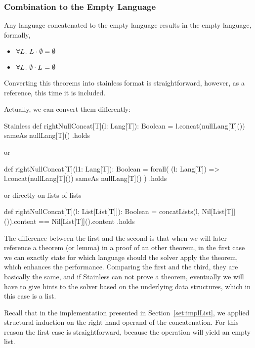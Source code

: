 \subsubsection{Combination to the Empty Language}

\begin{theorem}
	Any language concatenated to the empty language results in the empty language, formally,
	\begin{itemize}
		\item $\forall L_{}. ~ L_{} \cdot \emptyset = \emptyset$
		\item $\forall L_{}. ~ \emptyset \cdot L_{} = \emptyset$
	\end{itemize}
\end{theorem}

Converting this theorems into stainless format is straightforward, however, as a reference, this time it is included.

Actually, we can convert them  differently:

\begin{ShortCode}{Stainless}
 def rightNullConcat[T](l: Lang[T]): Boolean = {
   l.concat(nullLang[T]()) sameAs nullLang[T]()
 }.holds	
 
 or
 
 def rightNullConcat[T](l1: Lang[T]): Boolean = {
   forall( (l: Lang[T]) => 
       l.concat(nullLang[T]()) sameAs nullLang[T]()
   )
 }.holds
 
 or directly on lists of lists
 
 def rightNullConcat[T](l: List[List[T]]): Boolean = {
    concatLists(l, Nil[List[T]]()).content == 
 	                               Nil[List[T]]().content
 }.holds
 
\end{ShortCode}

The difference between the first and the second is that when we will later reference a theorem (or lemma) in a proof of an other theorem, in the first case we can exactly state for which language should the solver apply the theorem, which enhances the performance. Comparing the first and the third, they are basically the same, and if Stainless can not prove a theorem, eventually we will have to give hints to the solver based on the underlying data structures, which in this case is a list.

Recall that in the implementation presented in Section~\ref{set:implList}, we applied structural induction on the right hand operand of the concatenation. For this reason the first case is straightforward, because the operation will yield an empty list. 

